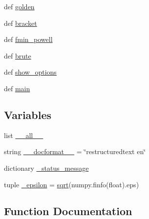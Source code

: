 \begin{DoxyCompactItemize}
\item 
def \hyperlink{namespacescipy_1_1optimize_1_1optimize_abf6e87803947c589e821c175f551dff2}{golden}
\item 
def \hyperlink{namespacescipy_1_1optimize_1_1optimize_a3aa1746665030fc604388aa22db3e6dd}{bracket}
\item 
def \hyperlink{namespacescipy_1_1optimize_1_1optimize_a62ccc9b2c6bfdcd2c168bd899dae8a17}{fmin\+\_\+powell}
\item 
def \hyperlink{namespacescipy_1_1optimize_1_1optimize_afbd077e695c6efe31abc98d5d4de687a}{brute}
\item 
def \hyperlink{namespacescipy_1_1optimize_1_1optimize_a979870d2383d7cff103f34be85182c9a}{show\+\_\+options}
\item 
def \hyperlink{namespacescipy_1_1optimize_1_1optimize_af85029d5f962caf6120e870266b3e89f}{main}
\end{DoxyCompactItemize}
\subsection*{Variables}
\begin{DoxyCompactItemize}
\item 
list \hyperlink{namespacescipy_1_1optimize_1_1optimize_a352ae7ae6c97270c980ee2ab5a79ff02}{\+\_\+\+\_\+all\+\_\+\+\_\+}
\item 
string \hyperlink{namespacescipy_1_1optimize_1_1optimize_a584735f307f25f012b46ea050e22f455}{\+\_\+\+\_\+docformat\+\_\+\+\_\+} = \char`\"{}restructuredtext en\char`\"{}
\item 
dictionary \hyperlink{namespacescipy_1_1optimize_1_1optimize_a7693ec03517c99592129c1db84464d17}{\+\_\+status\+\_\+message}
\item 
tuple \hyperlink{namespacescipy_1_1optimize_1_1optimize_a922ad0329a2cee476aa03d4d9abad53d}{\+\_\+epsilon} = \hyperlink{vecuops_8cc_ac9f82fdb8cd289615247f897852ee5f2}{sqrt}(numpy.\+finfo(float).eps)
\end{DoxyCompactItemize}


\subsection{Function Documentation}
\hypertarget{namespacescipy_1_1optimize_1_1optimize_a9887ba75efa188c345723e0511e7e43e}{}
